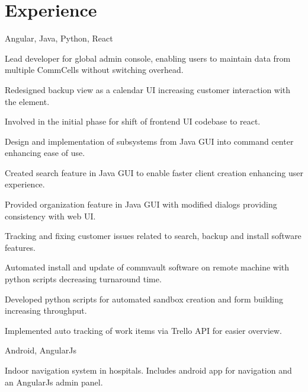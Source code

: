 \documentclass[]{font}
\begin{document}
\begin{minipage}[t]{0.66\textwidth} 


\section{Experience}
Angular, Java, Python, React
\vspace{\topsep}
\begin{tightemize}
\item Lead developer for global admin console, enabling users to maintain data from multiple CommCells without switching overhead. 
\item Redesigned backup view as a calendar UI increasing customer interaction with the element.
\item Involved in the initial phase for shift of frontend UI codebase to react.
\item Design and implementation of subsystems from Java GUI into command center enhancing ease of use.
\item Created search feature in Java GUI to enable faster client creation enhancing user experience.
\item Provided organization feature in Java GUI with modified dialogs providing consistency with web UI.
\item Tracking and fixing customer issues related to search, backup and install software features.
\item Automated install and update of commvault software on remote machine with python scripts decreasing turnaround time.
\item Developed python scripts for automated sandbox creation and form building increasing throughput. 
\item Implemented auto tracking of work items via Trello API for easier overview.
\end{tightemize}    
\sectionsep

Android, AngularJs 
\begin{tightemize}
\item Indoor navigation system in hospitals. Includes android app for navigation and an AngularJs admin panel.
\end{tightemize}    
\sectionsep


\end{minipage}
\end{document}

